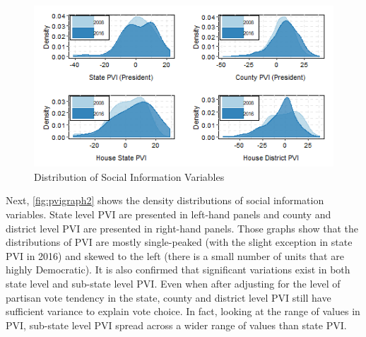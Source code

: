 \documentclass[doc,natbib,12pt]{apa6}\usepackage[]{graphicx}\usepackage[]{color}
\makeatletter
\def\maxwidth{ %
  \ifdim\Gin@nat@width>\linewidth
    \linewidth
  \else
    \Gin@nat@width
  \fi
}
\newenvironment{knitrout}{}{} %
\makeatother
\begin{document}
\begin{knitrout}
\color{fgcolor}\begin{figure}[t!!!]

{\centering \includegraphics[width=\maxwidth]{figure/pvigraph2-1} 

}

\caption[Distribution of Social Information Variables]{Distribution of Social Information Variables}\label{fig:pvigraph2}
\end{figure}


\end{knitrout}
    
    \par Next, \autoref{fig:pvigraph2} shows the density distributions of social information variables. State level PVI are presented in left-hand panels and county and district level PVI are presented in right-hand panels. Those graphs show that the distributions of PVI are mostly single-peaked (with the slight exception in state PVI in 2016) and skewed to the left (there is a small number of units that are highly Democratic). It is also confirmed that significant variations exist in both state level and sub-state level PVI. Even when after adjusting for the level of partisan vote tendency in the state, county and district level PVI still have sufficient variance to explain vote choice. In fact, looking at the range of values in PVI, sub-state level PVI spread across a wider range of values than state PVI. 
    
\end{document}
